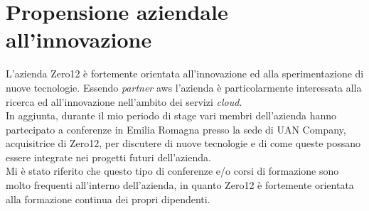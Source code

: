 \section{Propensione aziendale all'innovazione}
\label{sez:propensione-a-innovazione}

L'azienda Zero12 è fortemente orientata all'innovazione ed alla sperimentazione di nuove tecnologie.
Essendo \textit{partner} \gls{aws} l'azienda è particolarmente interessata alla ricerca ed all'innovazione nell'ambito dei servizi \textit{cloud}.\\
In aggiunta, durante il mio periodo di stage vari membri dell'azienda hanno partecipato a conferenze in Emilia Romagna presso la sede di UAN Company, acquisitrice di Zero12, 
per discutere di nuove tecnologie e di come queste possano essere integrate nei progetti futuri dell'azienda.\\
Mi è stato riferito che questo tipo di conferenze e/o corsi di formazione sono molto frequenti all'interno dell'azienda, in quanto Zero12 è fortemente orientata alla formazione continua dei propri dipendenti.\\